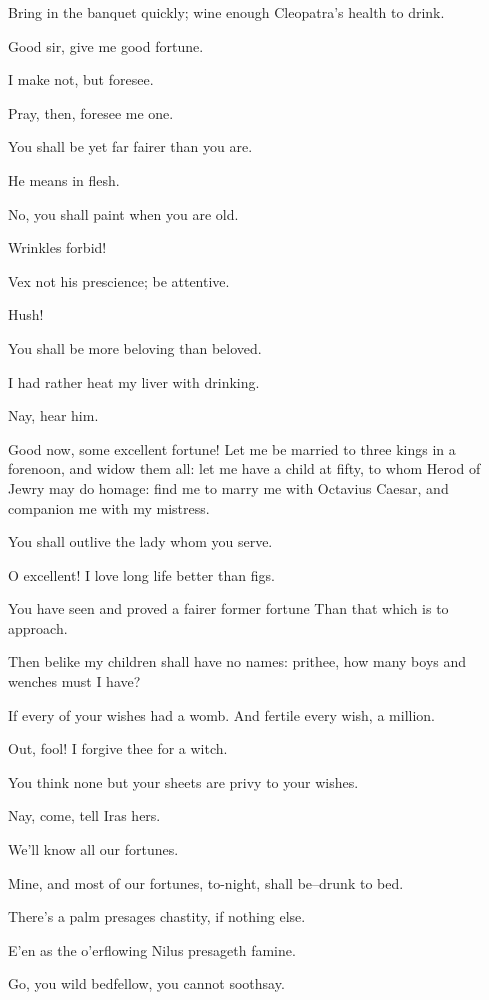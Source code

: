 \documentclass{book}
\begin{document}
	Bring in the banquet quickly; wine enough
	Cleopatra's health to drink. 

\begin{PROSE}

\7	Good sir, give me good fortune.

	I make not, but foresee. 

\7	Pray, then, foresee me one.

	You shall be yet far fairer than you are.

\7	He means in flesh. 

	No, you shall paint when you are old.

\7	Wrinkles forbid! 

\5	Vex not his prescience; be attentive.

\7	Hush!

	You shall be more beloving than beloved.

\7	I had rather heat my liver with drinking.

\5	Nay, hear him.

\7	Good now, some excellent fortune! Let me be married
	to three kings in a forenoon, and widow them all:
	let me have a child at fifty, to whom Herod of Jewry
	may do homage: find me to marry me with Octavius
	Caesar,  and companion me with my mistress.

	You shall outlive the lady whom you serve.

\7	O excellent! I love long life better than figs.

	You have seen and proved a fairer former fortune
	Than that which is to approach.

\7	Then belike my children shall have no names: 
	pri\-thee, how many boys and wenches must I have?

	If every of your wishes had a womb.
	And fertile every wish, a million.

\7	Out, fool! I forgive thee for a witch.

\5	You think none but your sheets are privy to your wishes.

\7	Nay, come, tell Iras hers.

\5	We'll know all our fortunes.

	Mine, and most of our fortunes, to-night, shall
	be--drunk to bed.

	There's a palm presages chastity, if nothing else.

\7	E'en as the o'erflowing Nilus presageth famine.

	Go, you wild bedfellow, you cannot soothsay.


\end{PROSE}
\end{document}
